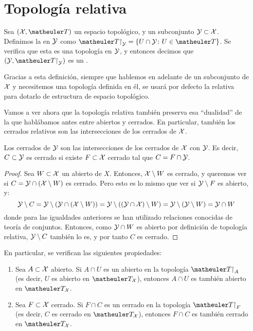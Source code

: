 \section{Topología relativa}

\begin{defi}
	Sea $(\X,\T)$ un espacio topológico, y un subconjunto $\mathcal{Y}\subset\mathcal{X}$. Definimos la  en $\mathcal{Y}$ como $\T\restriction_\mc{Y} = \{U\cap\mc{Y}\colon U\in\T\}$. Se verifica que esta es una topología en $\mathcal{Y}$, y entonces decimos que $(\mc{Y},\T\restriction_\mc{Y})$ es un .
\end{defi}

Gracias a esta definición, siempre que hablemos en adelante de un subconjunto de $\mathcal{X}$ y necesitemos una topología definida en él, se usará por defecto la relativa para dotarlo de estructura de espacio topológico.

Vamos a ver ahora que la topología relativa también preserva esa ``dualidad'' de la que hablábamos antes entre abiertos y cerrados. En particular, también los cerrados relativos son las intersecciones de los cerrados de $\mathcal{X}$.

\begin{prop}
	Los cerrados de $\mathcal{Y}$ son las intersecciones de los cerrados de $\mathcal{X}$ con $\mathcal{Y}$. Es decir, $C\subset\mathcal{Y}$ es cerrado si existe $F\subset\mathcal{X}$ cerrado tal que $C = F\cap\mathcal{Y}$.
	
	\begin{proof}
		Sea $W\subset\mathcal{X}$ un abierto de $X$. Entonces, $\mathcal{X}\setminus W$ es cerrado, y queremos ver si $C=\mathcal{Y}\cap(\mathcal{X}\setminus W)$ es cerrado. Pero esto es lo mismo que ver si $\mathcal{Y}\setminus F$ es abierto, y:
		\[\mathcal{Y}\setminus C=\mathcal{Y}\setminus (\mathcal{Y}\cap(\mathcal{X}\setminus W))=\mathcal{Y}\setminus ((\mathcal{Y}\cap\mathcal{X})\setminus W)=\mathcal{Y}\setminus (\mathcal{Y}\setminus W) = \mathcal{Y}\cap W\]
		donde para las igualdades anteriores se han utilizado relaciones conocidas de teoría de conjuntos. Entonces, como $\mathcal{Y}\cap W$ es abierto por definición de topología relativa, $\mathcal{Y}\setminus C$ también lo es, y por tanto $C$ es cerrado.
	\end{proof}
\end{prop}

\begin{obs}
	En particular, se verifican las siguientes propiedades:
	\begin{enumerate}
		\item Sea $A\subset\mathcal{X}$ abierto. Si $A\cap U$ es un abierto en la topología $\T\restriction_A$ (es decir, $U$ es abierto en $\T_\X$), entonces $A\cap U$ es también abierto en $\T_\X$.
		\item Sea $F\subset\mathcal{X}$ cerrado. Si $F\cap C$ es un cerrado en la topología $\T\restriction_F$ (es decir, $C$ es cerrado en $\T_\X$), entonces $F\cap C$ es también cerrado en $\T_\X$. \qedhere
	\end{enumerate}
\end{obs}